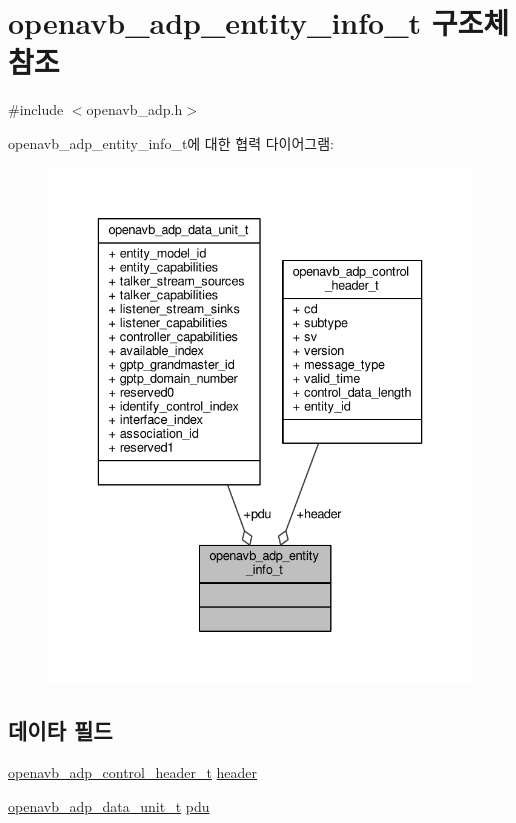 \hypertarget{structopenavb__adp__entity__info__t}{}\section{openavb\+\_\+adp\+\_\+entity\+\_\+info\+\_\+t 구조체 참조}
\label{structopenavb__adp__entity__info__t}


{\ttfamily \#include $<$openavb\+\_\+adp.\+h$>$}



openavb\+\_\+adp\+\_\+entity\+\_\+info\+\_\+t에 대한 협력 다이어그램\+:
\nopagebreak
\begin{figure}[H]
\begin{center}
\leavevmode
\includegraphics[width=336pt]{structopenavb__adp__entity__info__t__coll__graph}
\end{center}
\end{figure}
\subsection*{데이타 필드}
\begin{DoxyCompactItemize}
\item 
\hyperlink{structopenavb__adp__control__header__t}{openavb\+\_\+adp\+\_\+control\+\_\+header\+\_\+t} \hyperlink{structopenavb__adp__entity__info__t_ae9ac3201c2ad757d43a8c75f430a39c3}{header}
\item 
\hyperlink{structopenavb__adp__data__unit__t}{openavb\+\_\+adp\+\_\+data\+\_\+unit\+\_\+t} \hyperlink{structopenavb__adp__entity__info__t_a572a822389c9b7885725f32e0deaa340}{pdu}
\end{DoxyCompactItemize}


